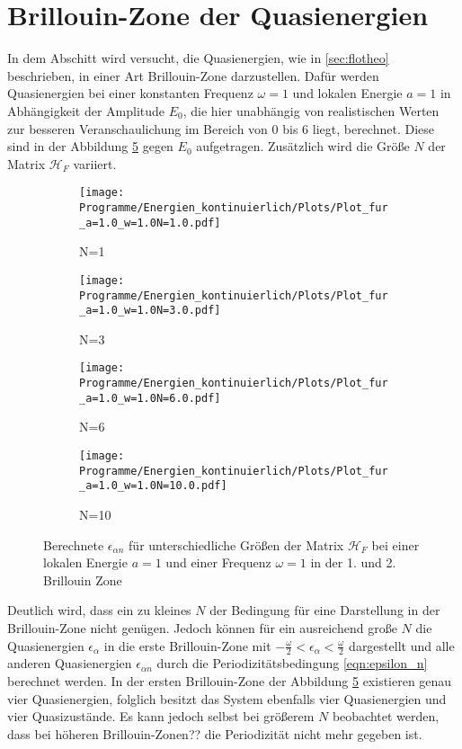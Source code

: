 \section{Brillouin-Zone der Quasienergien}
In dem Abschitt wird versucht, die Quasienergien, wie in
\ref{sec:flotheo} beschrieben, in einer Art
 Brillouin-Zone darzustellen.
Dafür werden Quasienergien bei einer konstanten Frequenz $\omega=1$ und
lokalen Energie $a=1$ in Abhängigkeit der
Amplitude $E_0$, die hier unabhängig
von realistischen Werten zur besseren Veranschaulichung im
Bereich von $0$ bis $6$ liegt, berechnet.
Diese sind in der Abbildung \ref{fig:brillouin} gegen $E_0$ aufgetragen.
Zusätzlich wird die Größe $N$ der Matrix $\mathcal{H}_F$ variiert.

\begin{figure}
  \centering
  \begin{subfigure}{0.48\textwidth}
    \texttt{[image: Programme/Energien\_kontinuierlich/Plots/Plot\_fur\_a=1.0\_w=1.0N=1.0.pdf]}
    \caption{N=1}
    \label{fig=N_1}
  \end{subfigure}
  \begin{subfigure}{0.48\textwidth}
    \texttt{[image: Programme/Energien\_kontinuierlich/Plots/Plot\_fur\_a=1.0\_w=1.0N=3.0.pdf]}
    \caption{N=3}
    \label{fig=N_3}
  \end{subfigure}
  \begin{subfigure}{0.48\textwidth}
    \texttt{[image: Programme/Energien\_kontinuierlich/Plots/Plot\_fur\_a=1.0\_w=1.0N=6.0.pdf]}
    \caption{N=6}
    \label{fig=N_6}
  \end{subfigure}
  \begin{subfigure}{0.48\textwidth}
    \texttt{[image: Programme/Energien\_kontinuierlich/Plots/Plot\_fur\_a=1.0\_w=1.0N=10.0.pdf]}
    \caption{N=10}
    \label{fig=N_3}
  \end{subfigure}
  \caption{Berechnete $\epsilon_{\alpha n}$ für unterschiedliche Größen der Matrix $\mathcal{H}_F$
  bei einer lokalen Energie $a=1$ und einer Frequenz $\omega=1$ in der 1. und 2. Brillouin Zone}
  \label{fig:brillouin}
\end{figure}

Deutlich wird, dass ein zu kleines $N$ der Bedingung für eine Darstellung in der Brillouin-Zone nicht genügen.
Jedoch können für ein ausreichend große $N$ die Quasienergien $\epsilon_\alpha$ in die erste Brillouin-Zone
mit $-\frac{\omega}{2}<\epsilon_\alpha<\frac{\omega}{2}$ dargestellt und
alle anderen Quasienergien $\epsilon_{\alpha n}$ durch die Periodizitätsbedingung \eqref{eqn:epsilon_n} berechnet werden.
In der ersten Brillouin-Zone der Abbildung \ref{fig:brillouin} existieren genau vier Quasienergien, folglich besitzt das System
ebenfalls vier Quasienergien und vier Quasizustände.
Es kann jedoch selbst bei größerem $N$ beobachtet werden, dass bei höheren Brillouin-Zonen?? die Periodizität nicht mehr gegeben ist.

